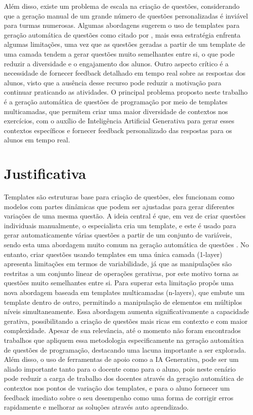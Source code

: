 Além disso, existe um problema de escala na criação de questões, considerando que a geração manual de um grande número de questões personalizadas é inviável para turmas numerosas. Algumas abordagens sugerem o uso de templates para geração automática de questões como citado por \parencite{zavala2018},  mais essa estratégia enfrenta algumas limitações, uma vez que as questões geradas a partir de um template de uma camada tendem a gerar questões muito semelhantes entre si, o que pode reduzir a diversidade e o engajamento dos alunos. Outro aspecto crítico é a necessidade de fornecer feedback detalhado em tempo real sobre as respostas dos alunos, visto que a ausência desse recurso pode reduzir a motivação para continuar praticando as atividades.  O principal problema proposto neste trabalho é a geração automática de questões de programação por meio de templates multicamadas, que permitem criar uma maior diversidade de contextos nos exercícios, com o auxílio de Inteligência Artificial Generativa para gerar esses contextos específicos e fornecer feedback personalizado das respostas para os alunos em tempo real.



\section{Justificativa}

Templates são estruturas base para criação de questões, eles funcionam como modelos com partes dinâmicas que podem ser ajustadas para gerar diferentes variações de uma mesma questão. A ideia central é que, em vez de criar questões individuais manualmente, o especialista cria um template, e este é usado para gerar automaticamente várias questões a partir de um conjunto de variáveis, sendo esta uma abordagem muito comum na geração automática de questões \parencite{zavala2018}.  No entanto, criar questões usando templates em uma única camada (1-layer) apresenta limitações em termos de variabilidade, já que as manipulações são restritas a um conjunto linear de operações gerativas, por  este motivo torna as questões muito semelhantes entre si. Para superar esta limitação \parencite{lai2013} propôs uma nova abordagem baseada em templates multicamadas (n-layers), que embute um template dentro de outro, permitindo a manipulação de elementos em múltiplos níveis simultaneamente. Essa abordagem aumenta significativamente a capacidade gerativa, possibilitando a criação de questões mais ricas em contexto e com maior complexidade. Apesar de sua relevância, até o momento não foram encontrados trabalhos que apliquem essa metodologia especificamente na geração automática de questões de programação, destacando uma lacuna importante a ser explorada. Além disso, o uso de ferramentas de apoio como a IA Generativa, pode ser um aliado importante tanto para o docente como para o aluno, pois neste cenário pode reduzir a carga de trabalho dos docentes através da geração automática de contextos nos pontos de variação dos templates, e para o aluno fornecer um feedback  imediato sobre o seu desempenho como uma forma de corrigir erros rapidamente e melhorar as soluções através auto aprendizado.

